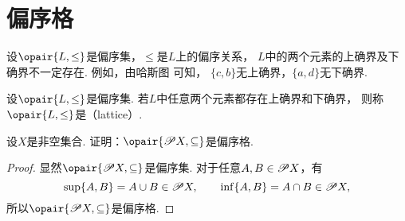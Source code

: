 \section{偏序格}
设\(\opair{L,\leq}\)是偏序集，\(\leq\)是\(L\)上的偏序关系，
\(L\)中的两个元素的上确界及下确界不一定存在.
例如，由哈斯图  可知，
\(\{c,b\}\)无上确界，\(\{a,d\}\)无下确界.

\begin{figure}[htb]
	\centering
	\caption{}
	\label{figure:格论.偏序集1}
\end{figure}

\begin{definition}
设\(\opair{L,\leq}\)是偏序集.
若\(L\)中任意两个元素都存在上确界和下确界，
则称\(\opair{L,\leq}\)是（lattice）.
\end{definition}

\begin{example}
设\(X\)是非空集合.
证明：\(\opair{\Powerset X,\subseteq}\)是偏序格.
\begin{proof}
显然\(\opair{\Powerset X,\subseteq}\)是偏序集.
对于任意\(A,B \in \mathscr{P} X\)，有\[
	\sup\{A,B\}
	= A \cup B
	\in \mathscr{P} X,
	\qquad
	\inf\{A,B\}
	= A \cap B
	\in \mathscr{P} X,
\]
所以\(\opair{\Powerset X,\subseteq}\)是偏序格.
\end{proof}
\end{example}
